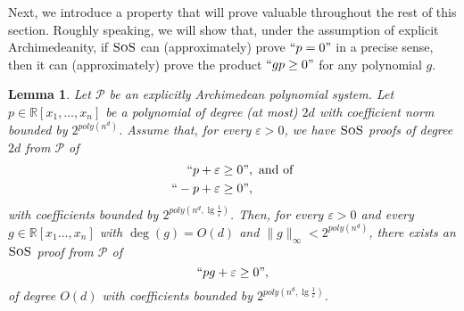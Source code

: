 \documentclass[11pt]{article}
\newcommand{\sos}{\text{\sc{SoS}}}
\newcommand{\1}{\textbf{1}}
\newtheorem{lemma}[theorem]{Lemma}
\begin{document}
Next, we introduce a property that will prove valuable throughout the rest of this section. Roughly speaking, we will show that, under the assumption of explicit Archimedeanity, if $\sos$ can (approximately) prove $``p=0"$ in a precise sense, then it can (approximately) prove the product $``gp \geq 0"$ for any polynomial $g$.

\begin{lemma}\label{lemma-pg-e}
    Let $\mathcal{P}$ be an explicitly Archimedean polynomial system. Let $p \in \mathbb{R}[x_1,\ldots,x_n]$ be a polynomial of degree (at most) $2d$ with coefficient norm bounded by $2^{poly(n^d)}$.
    Assume that, for every $\varepsilon>0$, we have $\sos$ proofs of degree $2d$ from $\mathcal{P}$ of
    \begin{align}
      \begin{split}
          ``p + \varepsilon &\geq 0", \text{ and of} \\
          ``-p + \varepsilon &\geq 0",      
      \end{split}
    \end{align} 
    with coefficients bounded by $2^{poly(n^d, \lg \frac{1}{\varepsilon})}$. Then, for every $\varepsilon>0$ and every $g \in \mathbb{R}[x_1 \dots, x_n]$ with $\deg(g) = O(d)$ and $\| g \|_{\infty} < 2^{poly(n^d)}$, there exists an $\sos$ proof from $\mathcal{P}$ of  
    $$`` pg + \varepsilon \geq 0",$$
    of degree $O(d)$ with coefficients bounded by $2^{poly(n^d, \lg \frac{1}{\varepsilon})}$.
\end{lemma}
\end{document}
